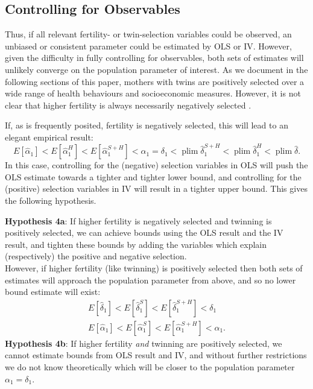 \documentclass[subeqn]{article}
\DeclareMathOperator{\plim}{plim}
\begin{document}
\begin{spacing}{1.4}
\subsection{Controlling for Observables}
Thus, if all relevant fertility- or twin-selection variables could be observed,
an unbiased or consistent parameter could be estimated by OLS or IV.  However,
given the difficulty in fully controlling for observables, both sets of estimates
will unlikely converge on the population parameter of interest. As we document
in the following sections of this paper, mothers with twins are positively
selected over a wide range of health behaviours and socioeconomic measures.
However, it is not clear that higher fertility is always necessarily negatively
selected \citep{Fortetal2016,Myrskylaetal2009}.

If, as is frequently posited, fertility is negatively selected, this will lead
to an elegant empirical result:
\[
E[\hat\alpha_1] < E[\hat\alpha_1^{H}] < E[\hat\alpha_1^{S+H}] < \alpha_1 =  \delta_1 < \plim\hat\delta_1^{S+H} < \plim\hat\delta_1^{H}<\plim\hat\delta.
\]
In this case, controlling for the (negative) selection variables in OLS will
push the OLS estimate towards a tighter and tighter lower bound, and controlling
for the (positive) selection variables in IV will result in a tighter upper bound.
This gives the following hypothesis.

\noindent \textbf{Hypothesis 4a}: If higher fertility is negatively selected and twinning is positively selected, we can achieve bounds using the OLS result and the IV result, and tighten these bounds by adding the variables which explain (respectively) the positive and negative selection.
\\
However, if higher fertility (like twinning) is positively selected then both
sets of estimates will approach the population parameter from above, and so
no lower bound estimate will exist:
\begin{eqnarray}
  E[\hat\delta_1] < E[\hat\delta_1^{S}] < E[\hat\delta_1^{S+H}] < \delta_1  \nonumber \\
  E[\hat\alpha_1] < E[\hat\alpha_1^{S}] < E[\hat\alpha_1^{S+H}] < \alpha_1. \nonumber
\end{eqnarray}
\noindent \textbf{Hypothesis 4b}: If higher fertility \emph{and} twinning are positively selected, we cannot estimate bounds from OLS result and IV, and without further restrictions we do not know theoretically which will be closer to the population parameter $\alpha_1=\delta_1$.


\end{spacing}
\end{document}
